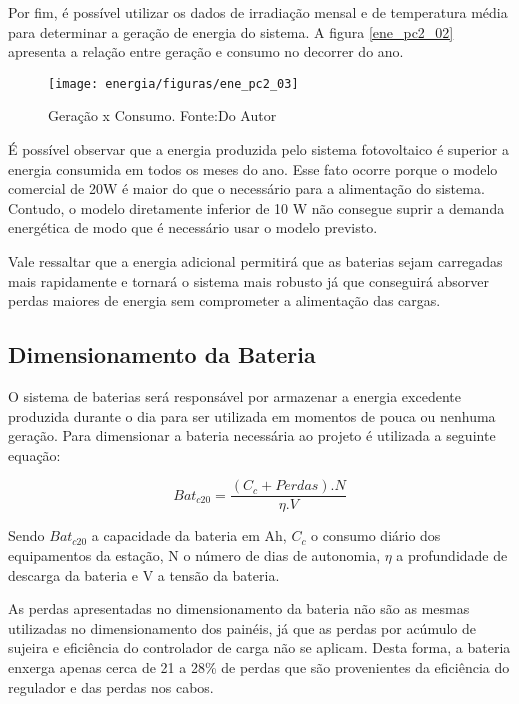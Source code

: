 Por fim, é possível utilizar os dados de irradiação mensal e de temperatura média para determinar a geração de energia do sistema. A figura \ref{ene_pc2_02} apresenta a relação entre geração e consumo no decorrer do ano.

\begin{figure}[H]
		\centering
		\texttt{[image: energia/figuras/ene\_pc2\_03]}
		\caption{Geração x Consumo. Fonte:Do Autor}
		\label{ene_pc2_03}
\end{figure}

É possível observar que a energia produzida pelo sistema fotovoltaico é superior a energia consumida em todos os meses do ano. Esse fato ocorre porque o modelo comercial de 20W é maior do que o necessário para a alimentação do sistema. Contudo, o modelo diretamente inferior de 10 W não consegue suprir a demanda energética de modo que é necessário usar o modelo previsto.

	Vale ressaltar que a energia adicional permitirá que as baterias sejam carregadas mais rapidamente e tornará o sistema mais robusto já que conseguirá absorver perdas maiores de energia sem comprometer a alimentação das cargas.

\subsection{Dimensionamento da Bateria}


	O sistema de baterias será responsável por armazenar a energia excedente produzida durante o dia para ser utilizada em momentos de pouca ou nenhuma geração. Para dimensionar a bateria necessária ao projeto é utilizada a seguinte equação:

\begin{equation}
Bat_{c20} = \dfrac{(C_c + Perdas). N}{\eta . V}  
\end{equation}

	Sendo $Bat_{c20}$ a capacidade da bateria em Ah, $C_c$ o consumo diário dos equipamentos da estação, N o número de dias de autonomia, $\eta$ a profundidade de descarga da bateria e V a tensão da bateria.
	
	As perdas apresentadas no dimensionamento da bateria não são as mesmas utilizadas no dimensionamento dos painéis, já que as perdas por acúmulo de sujeira e eficiência do controlador de carga não se aplicam. Desta forma, a bateria enxerga apenas cerca de 21 a 28\% de perdas que são provenientes da eficiência do regulador e das perdas nos cabos.
	
